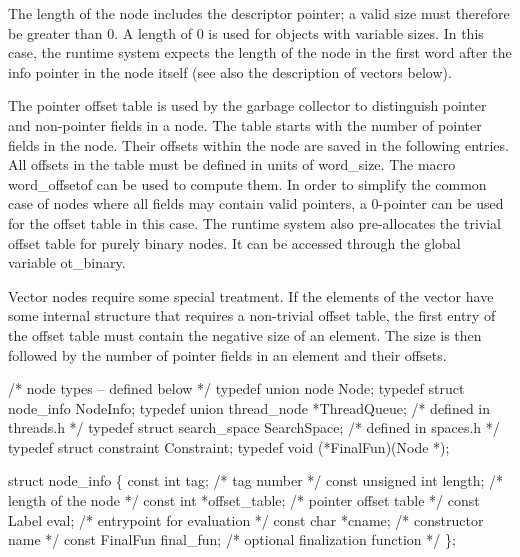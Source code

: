 The length of the node includes the descriptor pointer; a valid size
must therefore be greater than 0. A length of 0 is used for objects
with variable sizes. In this case, the runtime system expects the
length of the node in the first word after the info pointer in the
node itself (see also the description of vectors below).

The pointer offset table is used by the garbage collector to
distinguish pointer and non-pointer fields in a node. The table starts
with the number of pointer fields in the node. Their offsets within
the node are saved in the following entries. All offsets in the table
must be defined in units of {\Tt{}word{\_}size\nwendquote}. The macro {\Tt{}word{\_}offsetof\nwendquote}
can be used to compute them. In order to simplify the common case of
nodes where all fields may contain valid pointers, a 0-pointer can be
used for the offset table in this case. The runtime system also
pre-allocates the trivial offset table for purely binary nodes. It can
be accessed through the global variable {\Tt{}ot{\_}binary\nwendquote}.

Vector nodes require some special treatment. If the elements of the
vector have some internal structure that requires a non-trivial offset
table, the first entry of the offset table must contain the negative
size of an element. The size is then followed by the number of pointer
fields in an element and their offsets.

\nwenddocs{}\plusendmoddef\nwstartdeflinemarkup{}\nwenddeflinemarkup
/* node types -- defined below */
typedef union node          Node;
typedef struct node_info    NodeInfo;
typedef union thread_node   *ThreadQueue;       /* defined in threads.h */
typedef struct search_space SearchSpace;        /* defined in spaces.h */
typedef struct constraint   Constraint;
typedef void (*FinalFun)(Node *);

struct node_info
\{
    const int          tag;             /* tag number */
    const unsigned int length;          /* length of the node */
    const int          *offset_table;   /* pointer offset table */
    const Label        eval;            /* entrypoint for evaluation */
    const char         *cname;          /* constructor name */
    const FinalFun     final_fun;       /* optional finalization function */
\};

